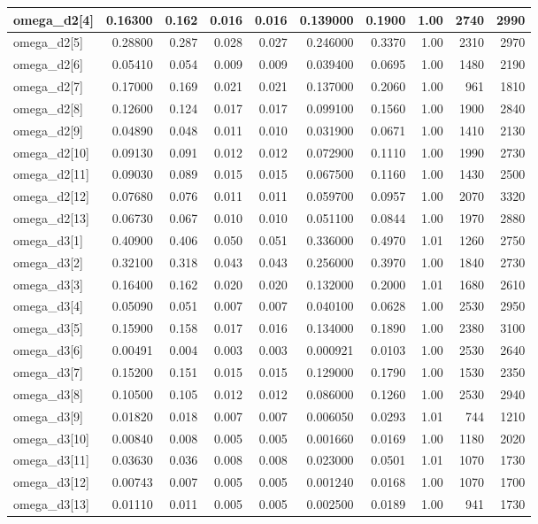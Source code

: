\documentclass[
]{article}
\begin{document}
\begin{longtable*}[t]{l|r|r|r|r|r|r|r|r|r}
\hline
omega\_d2[4] & 0.16300 & 0.162 & 0.016 & 0.016 & 0.139000 & 0.1900 & 1.00 & 2740 & 2990\\
\hline
omega\_d2[5] & 0.28800 & 0.287 & 0.028 & 0.027 & 0.246000 & 0.3370 & 1.00 & 2310 & 2970\\
\hline
omega\_d2[6] & 0.05410 & 0.054 & 0.009 & 0.009 & 0.039400 & 0.0695 & 1.00 & 1480 & 2190\\
\hline
omega\_d2[7] & 0.17000 & 0.169 & 0.021 & 0.021 & 0.137000 & 0.2060 & 1.00 & 961 & 1810\\
\hline
omega\_d2[8] & 0.12600 & 0.124 & 0.017 & 0.017 & 0.099100 & 0.1560 & 1.00 & 1900 & 2840\\
\hline
omega\_d2[9] & 0.04890 & 0.048 & 0.011 & 0.010 & 0.031900 & 0.0671 & 1.00 & 1410 & 2130\\
\hline
omega\_d2[10] & 0.09130 & 0.091 & 0.012 & 0.012 & 0.072900 & 0.1110 & 1.00 & 1990 & 2730\\
\hline
omega\_d2[11] & 0.09030 & 0.089 & 0.015 & 0.015 & 0.067500 & 0.1160 & 1.00 & 1430 & 2500\\
\hline
omega\_d2[12] & 0.07680 & 0.076 & 0.011 & 0.011 & 0.059700 & 0.0957 & 1.00 & 2070 & 3320\\
\hline
omega\_d2[13] & 0.06730 & 0.067 & 0.010 & 0.010 & 0.051100 & 0.0844 & 1.00 & 1970 & 2880\\
\hline
omega\_d3[1] & 0.40900 & 0.406 & 0.050 & 0.051 & 0.336000 & 0.4970 & 1.01 & 1260 & 2750\\
\hline
omega\_d3[2] & 0.32100 & 0.318 & 0.043 & 0.043 & 0.256000 & 0.3970 & 1.00 & 1840 & 2730\\
\hline
omega\_d3[3] & 0.16400 & 0.162 & 0.020 & 0.020 & 0.132000 & 0.2000 & 1.01 & 1680 & 2610\\
\hline
omega\_d3[4] & 0.05090 & 0.051 & 0.007 & 0.007 & 0.040100 & 0.0628 & 1.00 & 2530 & 2950\\
\hline
omega\_d3[5] & 0.15900 & 0.158 & 0.017 & 0.016 & 0.134000 & 0.1890 & 1.00 & 2380 & 3100\\
\hline
omega\_d3[6] & 0.00491 & 0.004 & 0.003 & 0.003 & 0.000921 & 0.0103 & 1.00 & 2530 & 2640\\
\hline
omega\_d3[7] & 0.15200 & 0.151 & 0.015 & 0.015 & 0.129000 & 0.1790 & 1.00 & 1530 & 2350\\
\hline
omega\_d3[8] & 0.10500 & 0.105 & 0.012 & 0.012 & 0.086000 & 0.1260 & 1.00 & 2530 & 2940\\
\hline
omega\_d3[9] & 0.01820 & 0.018 & 0.007 & 0.007 & 0.006050 & 0.0293 & 1.01 & 744 & 1210\\
\hline
omega\_d3[10] & 0.00840 & 0.008 & 0.005 & 0.005 & 0.001660 & 0.0169 & 1.00 & 1180 & 2020\\
\hline
omega\_d3[11] & 0.03630 & 0.036 & 0.008 & 0.008 & 0.023000 & 0.0501 & 1.01 & 1070 & 1730\\
\hline
omega\_d3[12] & 0.00743 & 0.007 & 0.005 & 0.005 & 0.001240 & 0.0168 & 1.00 & 1070 & 1700\\
\hline
omega\_d3[13] & 0.01110 & 0.011 & 0.005 & 0.005 & 0.002500 & 0.0189 & 1.00 & 941 & 1730\\
\hline
\end{longtable*}
\endgroup{}
\end{document}
